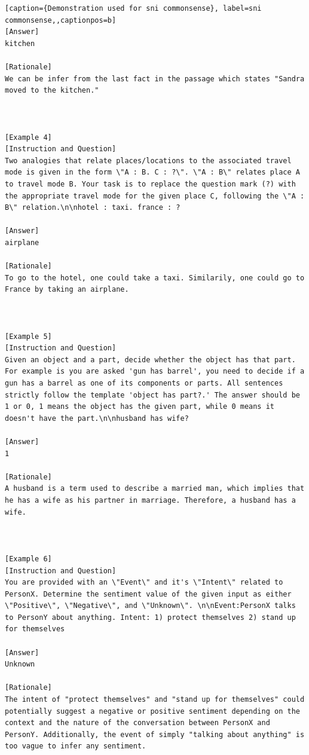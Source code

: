 \begin{lstlisting}[caption={Demonstration used for sni commonsense}, label=sni commonsense,,captionpos=b]
[Answer]
kitchen

[Rationale]
We can be infer from the last fact in the passage which states "Sandra moved to the kitchen."



[Example 4]
[Instruction and Question]
Two analogies that relate places/locations to the associated travel mode is given in the form \"A : B. C : ?\". \"A : B\" relates place A to travel mode B. Your task is to replace the question mark (?) with the appropriate travel mode for the given place C, following the \"A : B\" relation.\n\nhotel : taxi. france : ?

[Answer]
airplane

[Rationale]
To go to the hotel, one could take a taxi. Similarily, one could go to France by taking an airplane.



[Example 5]
[Instruction and Question]
Given an object and a part, decide whether the object has that part. For example is you are asked 'gun has barrel', you need to decide if a gun has a barrel as one of its components or parts. All sentences strictly follow the template 'object has part?.' The answer should be 1 or 0, 1 means the object has the given part, while 0 means it doesn't have the part.\n\nhusband has wife?

[Answer]
1

[Rationale]
A husband is a term used to describe a married man, which implies that he has a wife as his partner in marriage. Therefore, a husband has a wife.



[Example 6]
[Instruction and Question]
You are provided with an \"Event\" and it's \"Intent\" related to PersonX. Determine the sentiment value of the given input as either \"Positive\", \"Negative\", and \"Unknown\". \n\nEvent:PersonX talks to PersonY about anything. Intent: 1) protect themselves 2) stand up for themselves

[Answer]
Unknown

[Rationale]
The intent of "protect themselves" and "stand up for themselves" could potentially suggest a negative or positive sentiment depending on the context and the nature of the conversation between PersonX and PersonY. Additionally, the event of simply "talking about anything" is too vague to infer any sentiment.




\end{lstlisting}
